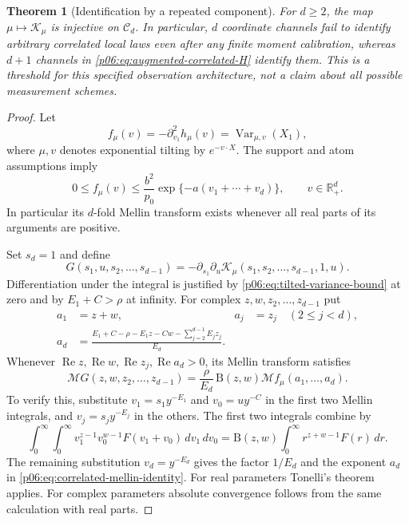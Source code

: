 \documentclass[11pt,letterpaper]{article}
\newtheorem{theorem}{Theorem}[section]
\theoremstyle{definition}
\theoremstyle{remark}
\renewcommand{\Re}{\operatorname{Re}}
\newcommand{\1}{\mathbf 1}
\begin{document}
\begin{theorem}[Identification by a repeated component]
\label{p06:thm:one-channel-restoration}
For $d\ge2$, the map $\mu\mapsto\mathcal K_\mu$ is injective on
$\mathcal C_d$. In particular, $d$ coordinate channels fail to identify
arbitrary correlated local laws even after any finite moment calibration,
whereas $d+1$ channels in \eqref{p06:eq:augmented-correlated-H} identify them.
This is a threshold for this specified observation architecture, not a
claim about all possible measurement schemes.
\end{theorem}
\begin{proof}
Let
\[
 f_\mu(v)=-\partial_{v_1}^2h_\mu(v)
 =\operatorname{Var}_{\mu,v}(X_1),
\]
where $\mu,v$ denotes exponential tilting by $e^{-v\cdot X}$.
The support and atom assumptions imply
\begin{equation}\label{p06:eq:tilted-variance-bound}
 0\le f_\mu(v)\le \frac{b^2}{p_0}
 \exp\{-a(v_1+\cdots+v_d)\},\qquad v\in\mathbb R_+^d.
\end{equation}
In particular its $d$-fold Mellin transform exists whenever all real
parts of its arguments are positive.

Set $s_d=1$ and define
\[
 G(s_1,u,s_2,\ldots,s_{d-1})
 =-\partial_{s_1}\partial_u
 \mathcal K_\mu(s_1,s_2,\ldots,s_{d-1},1,u).
\]
Differentiation under the integral is justified by
\eqref{p06:eq:tilted-variance-bound} at zero and by $E_1+C>\rho$ at infinity.
For complex $z,w,z_2,\ldots,z_{d-1}$ put
\begin{align*}
 a_1&=z+w, & a_j&=z_j\quad(2\le j<d),\\
 a_d&=\frac{E_1+C-\rho-E_1z-Cw-
                    \sum_{j=2}^{d-1}E_jz_j}{E_d}.
\end{align*}
Whenever $\Re z,\Re w,\Re z_j,\Re a_d>0$, its Mellin transform satisfies
\begin{equation}\label{p06:eq:correlated-mellin-identity}
 \mathcal M G(z,w,z_2,\ldots,z_{d-1})
 =\frac{\rho}{E_d}\,\mathrm B(z,w)
     \mathcal M f_\mu(a_1,\ldots,a_d).
\end{equation}
To verify this, substitute
$v_1=s_1y^{-E_1}$ and $v_0=uy^{-C}$ in the first two Mellin integrals,
and $v_j=s_jy^{-E_j}$ in the others. The first two integrals combine by
\[
 \int_0^\infty\!\int_0^\infty
 v_1^{z-1}v_0^{w-1}F(v_1+v_0)\,dv_1\,dv_0
 =\mathrm B(z,w)\int_0^\infty r^{z+w-1}F(r)\,dr.
\]
The remaining substitution $v_d=y^{-E_d}$ gives the factor
$1/E_d$ and the exponent $a_d$ in \eqref{p06:eq:correlated-mellin-identity}.
For real parameters Tonelli's theorem applies. For complex parameters
absolute convergence follows from the same calculation with real parts.


\end{proof}
\end{document}
